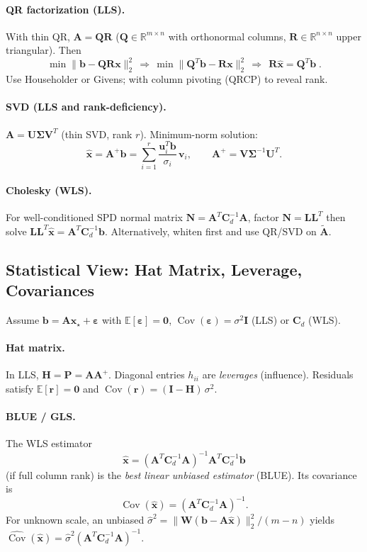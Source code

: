 \documentclass[11pt,a4paper]{article}
\begin{document}
\paragraph{QR factorization (LLS).} With thin QR, $\mathbf{A}=\mathbf{Q}\mathbf{R}$ ($\mathbf{Q}\in\mathbb{R}^{m\times n}$ with orthonormal columns, $\mathbf{R}\in\mathbb{R}^{n\times n}$ upper triangular). Then
\[
\min\|\mathbf{b}-\mathbf{Q}\mathbf{R}\mathbf{x}\|_2^2\,\Rightarrow\,\min\|\mathbf{Q}^T\mathbf{b}-\mathbf{R}\mathbf{x}\|_2^2\,\Rightarrow\,\boxed{\;\mathbf{R}\widehat{\mathbf{x}}=\mathbf{Q}^T\mathbf{b}\;}. 
\]
Use Householder or Givens; with column pivoting (QRCP) to reveal rank.

\paragraph{SVD (LLS and rank-deficiency).} $\mathbf{A}=\mathbf{U}\bm{\Sigma}\mathbf{V}^T$ (thin SVD, rank $r$). Minimum-norm solution:
\[
\widehat{\mathbf{x}}=\mathbf{A}^+\mathbf{b}=\sum_{i=1}^r\frac{\mathbf{u}_i^T\mathbf{b}}{\sigma_i}\,\mathbf{v}_i,\qquad \mathbf{A}^+=\mathbf{V}\bm{\Sigma}^{-1}\mathbf{U}^T.
\]
\paragraph{Cholesky (WLS).} For well-conditioned SPD normal matrix $\mathbf{N}=\mathbf{A}^T\mathbf{C}_d^{-1}\mathbf{A}$, factor $\mathbf{N}=\mathbf{L}\mathbf{L}^T$ then solve $\mathbf{L}\mathbf{L}^T\widehat{\mathbf{x}}=\mathbf{A}^T\mathbf{C}_d^{-1}\mathbf{b}$. Alternatively, whiten first and use QR/SVD on $\tilde{\mathbf{A}}$.

\subsection{Statistical View: Hat Matrix, Leverage, Covariances}
Assume $\mathbf{b}=\mathbf{A}\mathbf{x}_\star+\boldsymbol{\varepsilon}$ with $\mathbb{E}[\boldsymbol{\varepsilon}]=\mathbf{0}$, $\operatorname{Cov}(\boldsymbol{\varepsilon})=\sigma^2\mathbf{I}$ (LLS) or $\mathbf{C}_d$ (WLS).
\paragraph{Hat matrix.} In LLS, $\mathbf{H}=\mathbf{P}=\mathbf{A}\mathbf{A}^+$. Diagonal entries $h_{ii}$ are \emph{leverages} (influence). Residuals satisfy $\mathbb{E}[\mathbf{r}]=\mathbf{0}$ and $\operatorname{Cov}(\mathbf{r})=(\mathbf{I}-\mathbf{H})\,\sigma^2$.
\paragraph{BLUE / GLS.} The WLS estimator
\[
\widehat{\mathbf{x}}=(\mathbf{A}^T\mathbf{C}_d^{-1}\mathbf{A})^{-1}\mathbf{A}^T\mathbf{C}_d^{-1}\mathbf{b}
\]
(if full column rank) is the \emph{best linear unbiased estimator} (BLUE). Its covariance is
\[
\operatorname{Cov}(\widehat{\mathbf{x}})=(\mathbf{A}^T\mathbf{C}_d^{-1}\mathbf{A})^{-1}.
\]
For unknown scale, an unbiased $\hat{\sigma}^2=\|\mathbf{W}(\mathbf{b}-\mathbf{A}\widehat{\mathbf{x}})\|_2^2/(m-n)$ yields $\widehat{\operatorname{Cov}}(\widehat{\mathbf{x}})=\hat{\sigma}^2(\mathbf{A}^T\mathbf{C}_d^{-1}\mathbf{A})^{-1}$.
\end{document}
